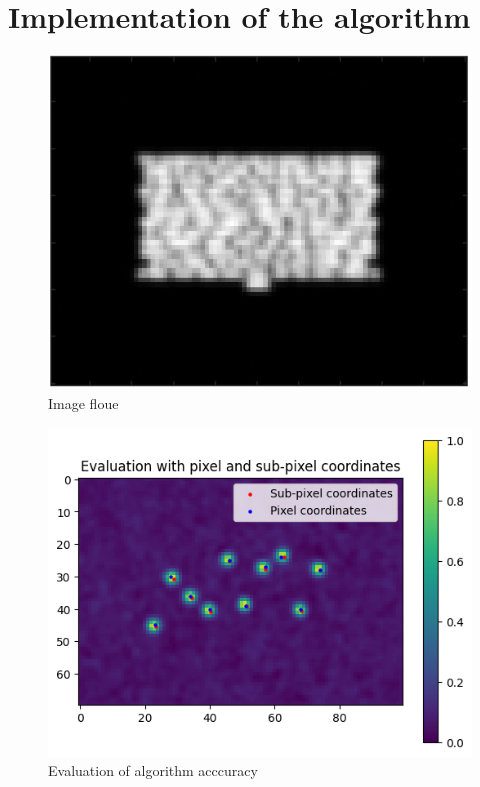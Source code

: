 \documentclass[10pt,letterpaper]{article}
\begin{document}
\section{Implementation of the algorithm}
\begin{figure}[h]
	\centering
	\includegraphics[scale=0.65]{ImageFloue.JPG}
	\caption{Image floue}
	\label{fig:floue}
\end{figure}


\begin{figure}[h]
	\centering
	\includegraphics[scale=0.65]{evaluation of algo.png}
	\caption{Evaluation of algorithm acccuracy}
	\label{fig:eval}
\end{figure}
\end{document}
